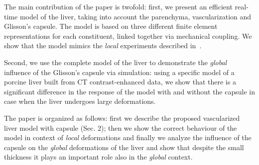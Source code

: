 \documentclass{llncs}
\begin{document}
The main contribution of the paper is twofold: first, we present an efficient real-time model of the liver, taking into account 
the parenchyma, vascularization and Glisson's capsule. The model is based on three different finite element representations for each constituent,
linked together via mechanical coupling. We show that the model mimics the \emph{local} experiments described in~\cite{Hollenstein2006}.
 
Second, we use the complete model of the liver to demonstrate the \emph{global} influence of the Glisson's
capsule via simulation: using a specific model of a porcine liver built from CT contrast-enhanced data, we show that there is a significant 
difference in the response of the model with and without the capsule in case when the liver undergoes large deformations. 

The paper is organized as follows: first we describe the proposed vascularized
liver model with capsule (Sec. 2); then we show the correct behaviour of the
model in context of \emph{local} deformations and finally we analyze the influence of
the capsule on the \emph{global} deformations of the liver and show that despite the
small thickness it plays an important role also in the \emph{global} context.
\end{document}
